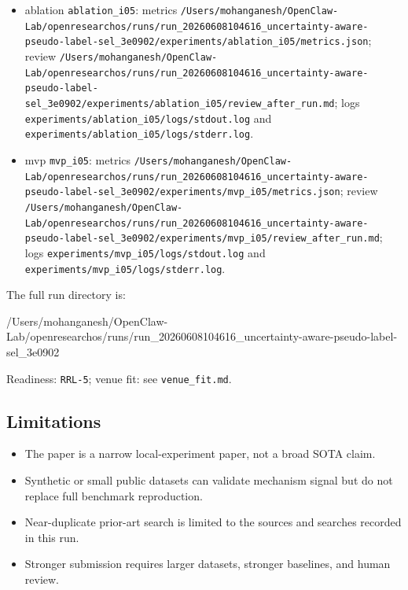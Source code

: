 \documentclass[
  11pt,
]{article}
\newenvironment{Shaded}{}{}
\newcommand{\NormalTok}[1]{#1}
\providecommand{\tightlist}{%
  \setlength{\itemsep}{0pt}\setlength{\parskip}{0pt}}
\begin{document}
\begin{itemize}
\item
  ablation \texttt{ablation\_i05}: metrics \texttt{/Users/mohanganesh/OpenClaw-Lab/openresearchos/runs/run\_20260608104616\_uncertainty-aware-pseudo-label-sel\_3e0902/experiments/ablation\_i05/metrics.json}; review \texttt{/Users/mohanganesh/OpenClaw-Lab/openresearchos/runs/run\_20260608104616\_uncertainty-aware-pseudo-label-sel\_3e0902/experiments/ablation\_i05/review\_after\_run.md}; logs \texttt{experiments/ablation\_i05/logs/stdout.log} and \texttt{experiments/ablation\_i05/logs/stderr.log}.
\item
  mvp \texttt{mvp\_i05}: metrics \texttt{/Users/mohanganesh/OpenClaw-Lab/openresearchos/runs/run\_20260608104616\_uncertainty-aware-pseudo-label-sel\_3e0902/experiments/mvp\_i05/metrics.json}; review \texttt{/Users/mohanganesh/OpenClaw-Lab/openresearchos/runs/run\_20260608104616\_uncertainty-aware-pseudo-label-sel\_3e0902/experiments/mvp\_i05/review\_after\_run.md}; logs \texttt{experiments/mvp\_i05/logs/stdout.log} and \texttt{experiments/mvp\_i05/logs/stderr.log}.
\end{itemize}

The full run directory is:

\begin{Shaded}
\begin{Highlighting}[]
\NormalTok{/Users/mohanganesh/OpenClaw{-}Lab/openresearchos/runs/run\_20260608104616\_uncertainty{-}aware{-}pseudo{-}label{-}sel\_3e0902}
\end{Highlighting}
\end{Shaded}

Readiness: \texttt{RRL-5}; venue fit: see \texttt{venue\_fit.md}.

\subsection{Limitations}\label{limitations}

\begin{itemize}
\tightlist
\item
  The paper is a narrow local-experiment paper, not a broad SOTA claim.
\item
  Synthetic or small public datasets can validate mechanism signal but do not replace full benchmark reproduction.
\item
  Near-duplicate prior-art search is limited to the sources and searches recorded in this run.
\item
  Stronger submission requires larger datasets, stronger baselines, and human review.
\end{itemize}
\end{document}
